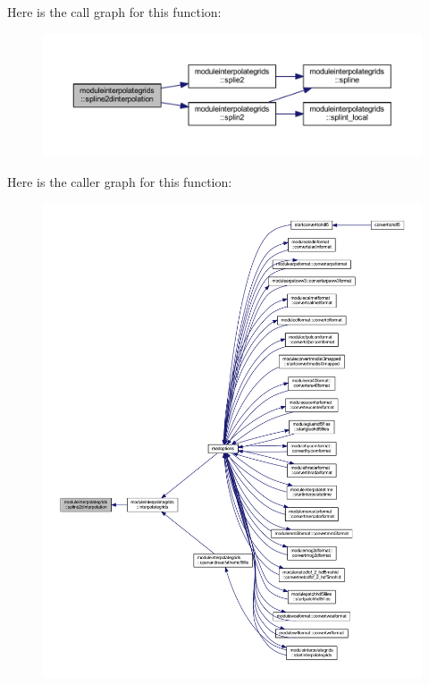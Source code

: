 Here is the call graph for this function\+:\nopagebreak
\begin{figure}[H]
\begin{center}
\leavevmode
\includegraphics[width=350pt]{namespacemoduleinterpolategrids_a5189e275a7867c5dd3f1a55dca3dacf3_cgraph}
\end{center}
\end{figure}
Here is the caller graph for this function\+:\nopagebreak
\begin{figure}[H]
\begin{center}
\leavevmode
\includegraphics[width=350pt]{namespacemoduleinterpolategrids_a5189e275a7867c5dd3f1a55dca3dacf3_icgraph}
\end{center}
\end{figure}
\mbox{\label{namespacemoduleinterpolategrids_a6c7fccee42f4e09612054b2280c92034}} 
